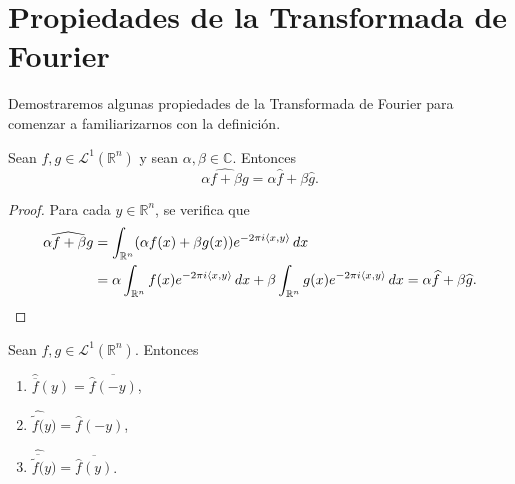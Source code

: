 \section{Propiedades de la Transformada de Fourier}
Demostraremos algunas propiedades de la Transformada de Fourier para comenzar a familiarizarnos con la definición.

\begin{proposicion}\label{prop_lineal}
    Sean $f,g \in \mathscr{L}^1(\mathbb{R}^n)$ y sean $\alpha,\beta \in \mathbb{C}$. Entonces
    \begin{equation}
         \widehat{\alpha f+\beta g} = \alpha \widehat{f} + \beta \widehat{g}.
    \end{equation}
\end{proposicion}

\begin{proof}
Para cada $y \in \mathbb{R}^n$, se verifica que
\begin{align*}
\widehat{ \alpha f+ \beta g} &= \int_{ \mathbb{R}^n}(\alpha f(x) + \beta g(x)) e^{-2\pi i \langle x, y \rangle} \, dx \\
&= \alpha \int_{\mathbb{R}^n} f(x)e^{-2 \pi i \langle x, y \rangle} \, dx + \beta \int_{\mathbb{R}^n} g(x)e^{-2 \pi i \langle x, y \rangle} \, dx
= \alpha \widehat{f} + \beta \widehat{g}. \qedhere
\end{align*}
\end{proof}

\begin{proposicion}\label{conju}
Sean $f,g \in \mathscr{L}^1(\mathbb{R}^n)$. Entonces 

\begin{enumerate}
    \item $\widehat{\overline{f}}(y) = \overline{\widehat{f}(-y)}$,
    \item $\widehat{\widetilde{f}(}y) = \widehat{f}(-y)$,
    \item $\widehat{\overline{\widetilde{f}(}}y) = \overline{\widehat{f}(y)}$.
\end{enumerate}
\end{proposicion}

